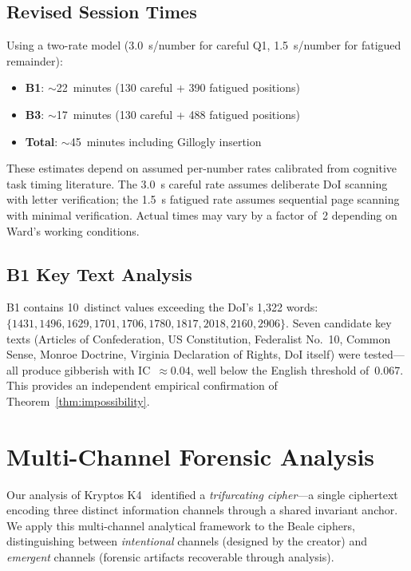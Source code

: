 \documentclass[11pt,a4paper]{article}
\begin{document}
\subsection{Revised Session Times}

Using a two-rate model (3.0~s/number for careful Q1, 1.5~s/number for fatigued
remainder):

\begin{itemize}[nosep]
    \item \textbf{B1}: $\sim$22~minutes (130 careful + 390 fatigued positions)
    \item \textbf{B3}: $\sim$17~minutes (130 careful + 488 fatigued positions)
    \item \textbf{Total}: $\sim$45~minutes including Gillogly insertion
\end{itemize}

\noindent These estimates depend on assumed per-number rates calibrated from
cognitive task timing literature. The 3.0~s careful rate assumes deliberate
DoI scanning with letter verification; the 1.5~s fatigued rate assumes
sequential page scanning with minimal verification. Actual times may vary
by a factor of~2 depending on Ward's working conditions.

\subsection{B1 Key Text Analysis}

B1 contains 10~distinct values exceeding the DoI's 1{,}322 words:
$\{1431, 1496, 1629, 1701, 1706, 1780, 1817, 2018, 2160, 2906\}$.
Seven candidate key texts (Articles of Confederation, US Constitution,
Federalist No.~10, Common Sense, Monroe Doctrine, Virginia Declaration
of Rights, DoI itself) were tested---all produce gibberish with IC~$\approx 0.04$,
well below the English threshold of~0.067. This provides an independent
empirical confirmation of Theorem~\ref{thm:impossibility}.

\section{Multi-Channel Forensic Analysis}
\label{sec:channels}

Our analysis of Kryptos K4~\cite{daugherty2026k4} identified a
\emph{trifurcating cipher}---a single ciphertext encoding three distinct
information channels through a shared invariant anchor. We apply this
multi-channel analytical framework to the Beale ciphers, distinguishing
between \emph{intentional} channels (designed by the creator) and
\emph{emergent} channels (forensic artifacts recoverable through analysis).
\end{document}

